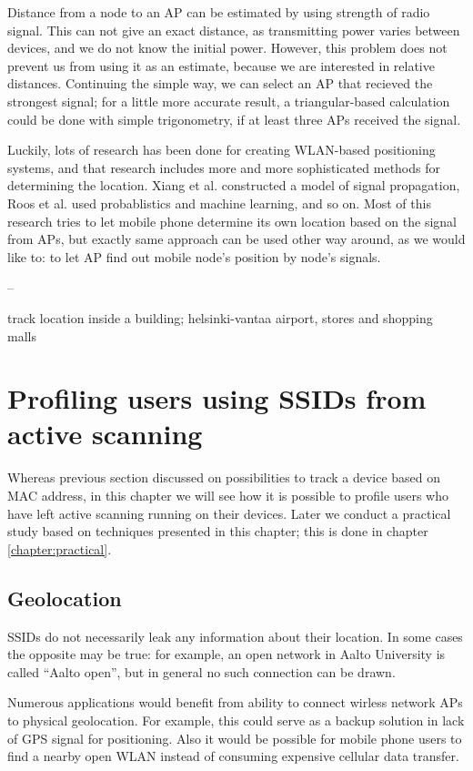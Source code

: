 \documentclass[12pt,a4paper,oneside,pdftex]{report}
\begin{document}
Distance from a node to an AP can be estimated by using strength of radio signal. This can not give an exact distance, as transmitting power varies between devices, and we do not know the initial power. However, this problem does not prevent us from using it as an estimate, because we are interested in relative distances. Continuing the simple way, we can select an AP that recieved the strongest signal; for a little more accurate result, a triangular-based calculation could be done with simple trigonometry, if at least three APs received the signal.

Luckily, lots of research has been done for creating WLAN-based positioning systems, and that research includes more and more sophisticated methods for determining the location. Xiang et al. \cite{xiang2004} constructed a model of signal propagation, Roos et al. \cite{roos2002} used probablistics and machine learning, and so on. Most of this research tries to let mobile phone determine its own location based on the signal from APs, but exactly same approach can be used other way around, as we would like to: to let AP find out mobile node's position by node's signals.

--

track location inside a building; helsinki-vantaa airport, stores and shopping malls

\section{Profiling users using SSIDs from active scanning}
\label{sec:ssid_profiling}

Whereas previous section discussed on possibilities to track a device based on MAC address, in this chapter we will see how it is possible to profile users who have left active scanning running on their devices. Later we conduct a practical study based on techniques presented in this chapter; this is done in chapter \ref{chapter:practical}. 

\subsection{Geolocation}
\label{subsec:ssid_geo}

SSIDs do not necessarily leak any information about their location. In some cases the opposite may be true: for example, an open network in Aalto University is called ``Aalto open'', but in general no such connection can be drawn.

Numerous applications would benefit from ability to connect wirless network APs to physical geolocation. For example, this could serve as a backup solution in lack of GPS signal for positioning. Also it would be possible for mobile phone users to find a nearby open WLAN instead of consuming expensive cellular data transfer.
\end{document}
